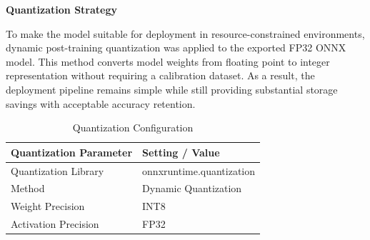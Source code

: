 \textbf{Quantization Strategy}

To make the model suitable for deployment in resource-constrained environments, dynamic post-training quantization was applied to the exported FP32 ONNX model. This method converts model weights from floating point to integer representation without requiring a calibration dataset. As a result, the deployment pipeline remains simple while still providing substantial storage savings with acceptable accuracy retention.

\begin{table}[H]
\caption{Quantization Configuration}
\centering
\begin{tabular}{|l|l|}
\hline
\textbf{Quantization Parameter} & \textbf{Setting / Value} \\
\hline
Quantization Library & onnxruntime.quantization \\
Method & Dynamic Quantization  \\
Weight Precision & INT8 \\
Activation Precision & FP32 \\
\hline
\end{tabular}
\end{table}
